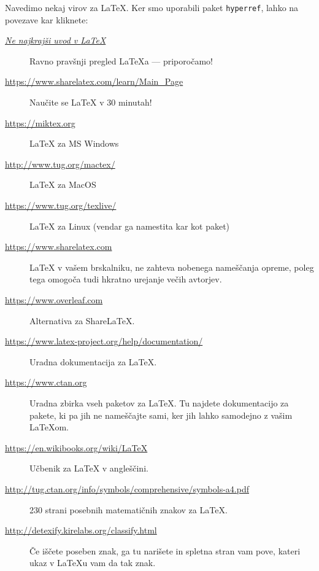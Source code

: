 \documentclass[a4paper]{article}
\begin{document}
Navedimo nekaj virov za {\LaTeX}. Ker smo uporabili paket \texttt{hyperref}, lahko na povezave kar kliknete:
%
\begin{description}
\item[\href{http://www-lp.fmf.uni-lj.si/plestenjak/vaje/latex/lshort.pdf}{\emph{Ne najkrajši uvod v {\LaTeX}}}]
  Ravno pravšnji pregled {\LaTeX}a --- priporočamo!

\item[\url{https://www.sharelatex.com/learn/Main_Page}]
  Naučite se LaTeX v 30 minutah!

\item[\url{https://miktex.org}] LaTeX za MS Windows

\item[\url{http://www.tug.org/mactex/}] LaTeX za MacOS

\item[\url{https://www.tug.org/texlive/}] LaTeX za Linux (vendar ga namestita kar kot paket)

\item[\url{https://www.sharelatex.com}] LaTeX v vašem brskalniku, ne zahteva nobenega
  nameščanja opreme, poleg tega omogoča tudi hkratno urejanje večih avtorjev.

\item[\url{https://www.overleaf.com}]
  Alternativa za ShareLaTeX.

\item[\url{https://www.latex-project.org/help/documentation/}]
  Uradna dokumentacija za {\LaTeX}.

\item[\url{https://www.ctan.org}] Uradna zbirka vseh paketov za {\LaTeX}. Tu najdete
  dokumentacijo za pakete, ki pa jih ne nameščajte sami, ker jih lahko samodejno z vašim
  LaTeXom.

\item[\url{https://en.wikibooks.org/wiki/LaTeX}]
  Učbenik za LaTeX v angleščini.

\item[\url{http://tug.ctan.org/info/symbols/comprehensive/symbols-a4.pdf}]
  230 strani posebnih matematičnih znakov za {\LaTeX}.

\item[\url{http://detexify.kirelabs.org/classify.html}] Če iščete poseben znak, ga tu
  narišete in spletna stran vam pove, kateri ukaz v {\LaTeX}u vam da tak znak.
\end{description}
\end{document}
